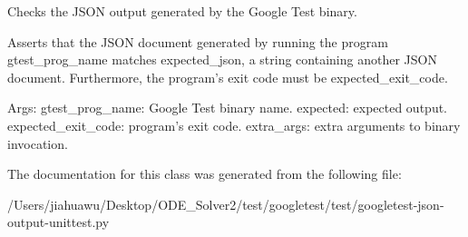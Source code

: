 \begin{DoxyVerb}Checks the JSON output generated by the Google Test binary.

Asserts that the JSON document generated by running the program
gtest_prog_name matches expected_json, a string containing another
JSON document.  Furthermore, the program's exit code must be
expected_exit_code.

Args:
  gtest_prog_name: Google Test binary name.
  expected: expected output.
  expected_exit_code: program's exit code.
  extra_args: extra arguments to binary invocation.
\end{DoxyVerb}
 

The documentation for this class was generated from the following file\+:\begin{DoxyCompactItemize}
\item 
/\+Users/jiahuawu/\+Desktop/\+O\+D\+E\+\_\+\+Solver2/test/googletest/test/googletest-\/json-\/output-\/unittest.\+py\end{DoxyCompactItemize}
